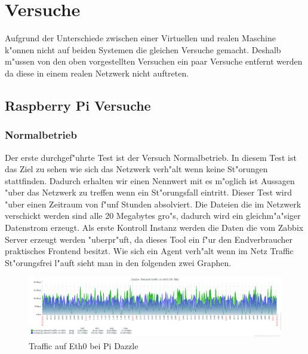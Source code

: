 \chapter{Versuche}
\label{cha:versuche}
Aufgrund der Unterschiede zwischen einer Virtuellen und realen Maschine k"onnen nicht auf beiden Systemen  %
die gleichen Versuche gemacht. Deshalb m"ussen von den oben vorgestellten Versuchen ein paar Versuche entfernt %
werden da diese in einem realen Netzwerk nicht auftreten.  

\section{Raspberry Pi Versuche}
\label{sec:raspberryPiVersuche}

\subsection{Normalbetrieb}
\label{subsec:normalbetrieb}
Der erste durchgef"uhrte Test ist der Versuch Normalbetrieb. In diesem Test ist das Ziel zu sehen wie %
sich das Netzwerk verh"alt wenn keine St"orungen stattfinden. Dadurch erhalten wir einen Nennwert mit es m"oglich ist %
Aussagen "uber das Netzwerk zu treffen wenn ein St"orungsfall eintritt. Dieser Test wird "uber einen Zeitraum von f"unf %
Stunden absolviert. Die Dateien die im Netzwerk verschickt werden sind alle 20 Megabytes gro"s, dadurch wird ein %
gleichm"a"siger Datenstrom erzeugt. Als erste Kontroll Instanz werden die Daten die vom Zabbix Server erzeugt werden %
"uberpr"uft, da dieses Tool ein f"ur den Endverbraucher praktisches Frontend besitzt. Wie sich ein Agent verh"alt %
wenn im Netz Traffic St"orungsfrei l"auft sieht man in den folgenden zwei Graphen.

\begin{figure}[htbp]
\centering
\includegraphics*[width=0.9\linewidth]{Abb/ZabbixDazzle/Standard/DazzleStandard}

\caption{Traffic auf Eth0 bei Pi Dazzle}
\label{fig:Eth0DazzleStandard}
\end{figure}

